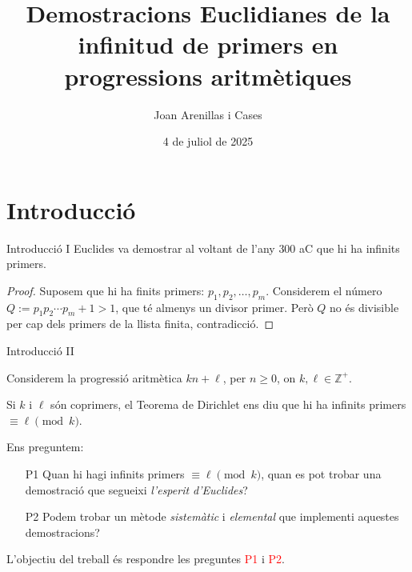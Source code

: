\documentclass[11pt]{beamer}
\author[Joan A.C.]{Joan Arenillas i Cases}
\title[Demostracions Euclidianes]{Demostracions Euclidianes de la infinitud de primers en progressions aritmètiques}
\institute[]{Universitat Autònoma de Barcelona \par Grau en Matemàtiques}
\date{4 de juliol de 2025}
\newcommand{\Z}{\ensuremath{\mathbb{Z}}}
\begin{document}
	
	\begin{frame}
	\titlepage
	\end{frame}
	
	
	\section{Introducció}
	
	\begin{frame}{Introducció I}
 	Euclides va demostrar al voltant de l'any $300$ aC que hi ha infinits primers.\newline \\
 	\pause
 	\begin{proof}
	 	Suposem que hi ha finits primers: $p_1,p_2,\dots,p_m$. Considerem el número $Q:=p_1p_2\cdots p_m+1>1$, que té almenys un divisor primer. \pause Però $Q$ no és divisible per cap dels primers de la llista finita, contradicció.
 	\end{proof}
	\end{frame}

	\begin{frame}{Introducció II}
		
	Considerem la progressió aritmètica $kn+\ell$, per $n\geqslant 0$, on $k,\ell \in\Z^+$. \newline \pause
	
	Si $k$ i $\ell$ són coprimers, el Teorema de Dirichlet ens diu que hi ha infinits primers $\equiv\ell\pmod{k}$. \pause
	\vspace{0.25cm}
		\begin{alertblock}{Ens preguntem:}
			\begin{itemize}
				\item[P1] Quan hi hagi infinits primers $\equiv\ell\pmod{k}$, quan es pot trobar una demostració que segueixi \emph{l'esperit d'Euclides}? \pause
				\item[P2] Podem trobar un mètode \emph{sistemàtic} i \emph{elemental} que implementi aquestes demostracions?\pause
			\end{itemize}
		\end{alertblock}
		\vspace{0.25cm}
		L'objectiu del treball és respondre les preguntes \textcolor{red}{P1} i \textcolor{red}{P2}.
	\end{frame}
	
\end{document}
